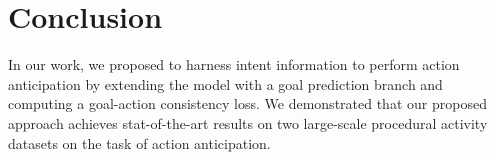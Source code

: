 \documentclass{article}
\begin{document}
\section{Conclusion}
\label{sec:conclusion}
\vspace{-0.1cm}
In our work, we proposed to harness intent information to perform action anticipation by extending the model with a goal prediction branch and computing a goal-action consistency loss. We demonstrated that our proposed approach achieves stat-of-the-art results on two large-scale procedural activity datasets on the task of action anticipation.

\newpage


\end{document}
